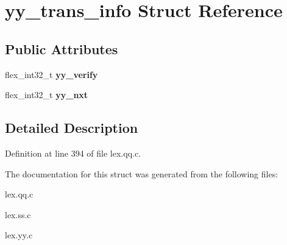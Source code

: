 \hypertarget{structyy__trans__info}{
\section{yy\_\-trans\_\-info Struct Reference}
\label{structyy__trans__info}
}
\subsection*{Public Attributes}
\begin{DoxyCompactItemize}
\item 
\hypertarget{structyy__trans__info_a5c9f61e770deef50bd4e697310342fe9}{
flex\_\-int32\_\-t {\bfseries yy\_\-verify}}
\label{structyy__trans__info_a5c9f61e770deef50bd4e697310342fe9}

\item 
\hypertarget{structyy__trans__info_ae0715250c2bef261e596e77e0030f13e}{
flex\_\-int32\_\-t {\bfseries yy\_\-nxt}}
\label{structyy__trans__info_ae0715250c2bef261e596e77e0030f13e}

\end{DoxyCompactItemize}


\subsection{Detailed Description}


Definition at line 394 of file lex.qq.c.



The documentation for this struct was generated from the following files:\begin{DoxyCompactItemize}
\item 
lex.qq.c\item 
lex.ss.c\item 
lex.yy.c\end{DoxyCompactItemize}
